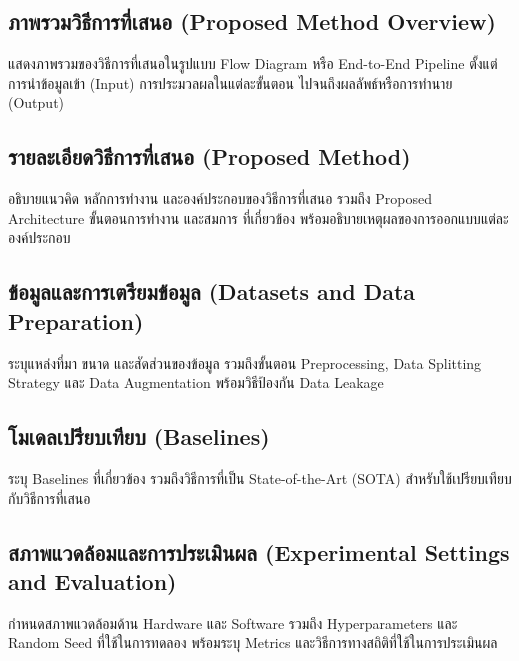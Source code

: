 \documentclass[20pt,a4paper]{article}
\begin{document}
\subsection{ภาพรวมวิธีการที่เสนอ
(Proposed Method Overview)}

แสดงภาพรวมของวิธีการที่เสนอในรูปแบบ Flow Diagram หรือ
End-to-End Pipeline ตั้งแต่การนำข้อมูลเข้า (Input)
การประมวลผลในแต่ละขั้นตอน ไปจนถึงผลลัพธ์หรือการทำนาย (Output)

\noindent\dotfill

\subsection{รายละเอียดวิธีการที่เสนอ
(Proposed Method)}

อธิบายแนวคิด หลักการทำงาน และองค์ประกอบของวิธีการที่เสนอ
รวมถึง Proposed Architecture ขั้นตอนการทำงาน และสมการ
ที่เกี่ยวข้อง พร้อมอธิบายเหตุผลของการออกแบบแต่ละองค์ประกอบ

\noindent\dotfill

\subsection{ข้อมูลและการเตรียมข้อมูล
(Datasets and Data Preparation)}

ระบุแหล่งที่มา ขนาด และสัดส่วนของข้อมูล รวมถึงขั้นตอน
Preprocessing, Data Splitting Strategy และ Data Augmentation
พร้อมวิธีป้องกัน Data Leakage

\noindent\dotfill

\subsection{โมเดลเปรียบเทียบ
(Baselines)}

ระบุ Baselines ที่เกี่ยวข้อง รวมถึงวิธีการที่เป็น
State-of-the-Art (SOTA) สำหรับใช้เปรียบเทียบกับวิธีการที่เสนอ

\noindent\dotfill

\subsection{สภาพแวดล้อมและการประเมินผล
(Experimental Settings and Evaluation)}

กำหนดสภาพแวดล้อมด้าน Hardware และ Software
รวมถึง Hyperparameters และ Random Seed ที่ใช้ในการทดลอง
พร้อมระบุ Metrics และวิธีการทางสถิติที่ใช้ในการประเมินผล

\noindent\dotfill

\end{document}
